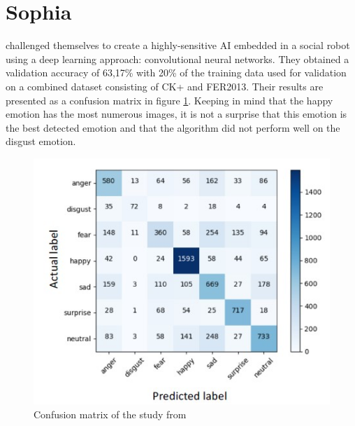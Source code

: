 \documentclass[runningheads,a4paper,12pt]{report}
\begin{document}
\section{Sophia}
\cite{hanson-sophia} challenged themselves to create a highly-sensitive AI embedded in a social robot using a deep learning approach: convolutional neural networks. They obtained a validation accuracy of 63,17\% with 20\% of the training data used for validation on a combined dataset consisting of CK+ and FER2013. Their results are presented as a confusion matrix in figure \ref{fig:hanson_sophia}. Keeping in mind that the happy emotion has the most numerous images, it is not a surprise that this emotion is the best detected emotion and that the algorithm did not perform well on the disgust emotion. 

\begin{figure}[h]
	\centering

  	\includegraphics[width=\linewidth]{./images/2_hanson_sophia}\hfill

    \caption{Confusion matrix of the study from \cite{hanson-sophia}}  
    \label{fig:hanson_sophia}
\end{figure}
\end{document}
